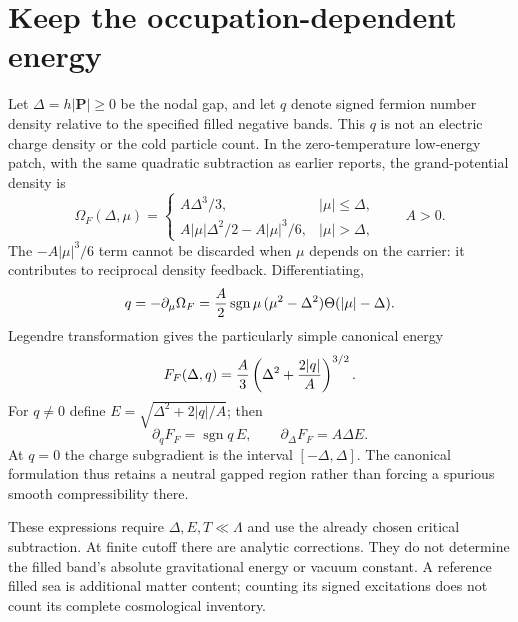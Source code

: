 \documentclass[11pt]{article}
\begin{document}
\section{Keep the occupation-dependent energy}
Let $\Delta=h|\mathbf P|\geq0$ be the nodal gap, and let $q$ denote
signed fermion number density relative to the specified filled negative
bands. This $q$ is not an electric charge density or the cold particle
count. In the zero-temperature low-energy patch, with the same quadratic
subtraction as earlier reports, the grand-potential density is
\begin{equation}
 \Omega_F(\Delta,\mu)=
 \begin{cases}
 A\Delta^3/3,& |\mu|\leq\Delta,\\
 A|\mu|\Delta^2/2-A|\mu|^3/6,& |\mu|>\Delta,
 \end{cases}\qquad A>0.
 \label{rb:grand}
\end{equation}
The $-A|\mu|^3/6$ term cannot be discarded when $\mu$ depends on
the carrier: it contributes to reciprocal density feedback. Differentiating,
\begin{equation}
 q=-\partial_\mu\Omega_F
 ={A\over2}\operatorname{sgn}\mu\,(\mu^2-\Delta^2)
                  \Theta(|\mu|-\Delta).
\end{equation}
Legendre transformation gives the particularly simple canonical energy
\begin{equation}
 F_F(\Delta,q)={A\over3}
                 \left(\Delta^2+{2|q|\over A}\right)^{3/2}.
 \label{rb:canonical}
\end{equation}
For $q\ne0$ define $E=\sqrt{\Delta^2+2|q|/A}$; then
\begin{equation}
 \partial_qF_F=\operatorname{sgn}q\,E,\qquad
 \partial_\Delta F_F=A\Delta E.
\end{equation}
At $q=0$ the charge subgradient is the interval $[-\Delta,\Delta]$.
The canonical formulation thus retains a neutral gapped region rather than
forcing a spurious smooth compressibility there.

These expressions require $\Delta,E,T\ll\Lambda$ and use the already
chosen critical subtraction. At finite cutoff there are analytic
corrections. They do not determine the filled band's absolute gravitational
energy or vacuum constant. A reference filled sea is additional matter
content; counting its signed excitations does not count its complete
cosmological inventory.
\end{document}
